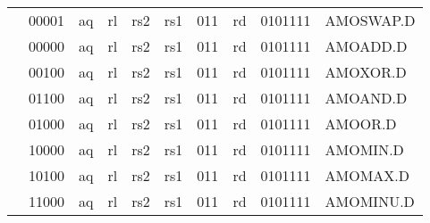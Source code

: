 \begin{table}[p]
\begin{small}
\begin{center}
\begin{tabular}{p{0in}p{0.4in}p{0.05in}p{0.05in}p{0.05in}p{0.05in}p{0.4in}p{0.6in}p{0.4in}p{0.6in}p{0.7in}l}
&
\multicolumn{2}{|c|}{00001} &
\multicolumn{1}{c|}{aq} &
\multicolumn{1}{c|}{rl} &
\multicolumn{2}{c|}{rs2} &
\multicolumn{1}{c|}{rs1} &
\multicolumn{1}{c|}{011} &
\multicolumn{1}{c|}{rd} &
\multicolumn{1}{c|}{0101111} & AMOSWAP.D \\
\cline{2-11}
  

&
\multicolumn{2}{|c|}{00000} &
\multicolumn{1}{c|}{aq} &
\multicolumn{1}{c|}{rl} &
\multicolumn{2}{c|}{rs2} &
\multicolumn{1}{c|}{rs1} &
\multicolumn{1}{c|}{011} &
\multicolumn{1}{c|}{rd} &
\multicolumn{1}{c|}{0101111} & AMOADD.D \\
\cline{2-11}
  

&
\multicolumn{2}{|c|}{00100} &
\multicolumn{1}{c|}{aq} &
\multicolumn{1}{c|}{rl} &
\multicolumn{2}{c|}{rs2} &
\multicolumn{1}{c|}{rs1} &
\multicolumn{1}{c|}{011} &
\multicolumn{1}{c|}{rd} &
\multicolumn{1}{c|}{0101111} & AMOXOR.D \\
\cline{2-11}
  

&
\multicolumn{2}{|c|}{01100} &
\multicolumn{1}{c|}{aq} &
\multicolumn{1}{c|}{rl} &
\multicolumn{2}{c|}{rs2} &
\multicolumn{1}{c|}{rs1} &
\multicolumn{1}{c|}{011} &
\multicolumn{1}{c|}{rd} &
\multicolumn{1}{c|}{0101111} & AMOAND.D \\
\cline{2-11}
  

&
\multicolumn{2}{|c|}{01000} &
\multicolumn{1}{c|}{aq} &
\multicolumn{1}{c|}{rl} &
\multicolumn{2}{c|}{rs2} &
\multicolumn{1}{c|}{rs1} &
\multicolumn{1}{c|}{011} &
\multicolumn{1}{c|}{rd} &
\multicolumn{1}{c|}{0101111} & AMOOR.D \\
\cline{2-11}
  

&
\multicolumn{2}{|c|}{10000} &
\multicolumn{1}{c|}{aq} &
\multicolumn{1}{c|}{rl} &
\multicolumn{2}{c|}{rs2} &
\multicolumn{1}{c|}{rs1} &
\multicolumn{1}{c|}{011} &
\multicolumn{1}{c|}{rd} &
\multicolumn{1}{c|}{0101111} & AMOMIN.D \\
\cline{2-11}
  

&
\multicolumn{2}{|c|}{10100} &
\multicolumn{1}{c|}{aq} &
\multicolumn{1}{c|}{rl} &
\multicolumn{2}{c|}{rs2} &
\multicolumn{1}{c|}{rs1} &
\multicolumn{1}{c|}{011} &
\multicolumn{1}{c|}{rd} &
\multicolumn{1}{c|}{0101111} & AMOMAX.D \\
\cline{2-11}
  

&
\multicolumn{2}{|c|}{11000} &
\multicolumn{1}{c|}{aq} &
\multicolumn{1}{c|}{rl} &
\multicolumn{2}{c|}{rs2} &
\multicolumn{1}{c|}{rs1} &
\multicolumn{1}{c|}{011} &
\multicolumn{1}{c|}{rd} &
\multicolumn{1}{c|}{0101111} & AMOMINU.D \\
\cline{2-11}
  


\end{tabular}
\end{center}
\end{small}
\end{table}
